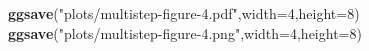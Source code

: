 \documentclass[
]{article}
\newenvironment{Shaded}{\begin{snugshade}}{\end{snugshade}}
\newcommand{\DataTypeTok}[1]{\textcolor[rgb]{0.13,0.29,0.53}{#1}}
\newcommand{\DecValTok}[1]{\textcolor[rgb]{0.00,0.00,0.81}{#1}}
\newcommand{\KeywordTok}[1]{\textcolor[rgb]{0.13,0.29,0.53}{\textbf{#1}}}
\newcommand{\NormalTok}[1]{#1}
\newcommand{\StringTok}[1]{\textcolor[rgb]{0.31,0.60,0.02}{#1}}
\begin{document}
\begin{Shaded}
\begin{Highlighting}[]
\KeywordTok{ggsave}\NormalTok{(}\StringTok{"plots/multistep-figure-4.pdf"}\NormalTok{,}\DataTypeTok{width=}\DecValTok{4}\NormalTok{,}\DataTypeTok{height=}\DecValTok{8}\NormalTok{)}
\KeywordTok{ggsave}\NormalTok{(}\StringTok{"plots/multistep-figure-4.png"}\NormalTok{,}\DataTypeTok{width=}\DecValTok{4}\NormalTok{,}\DataTypeTok{height=}\DecValTok{8}\NormalTok{)}
\end{Highlighting}
\end{Shaded}
\end{document}
